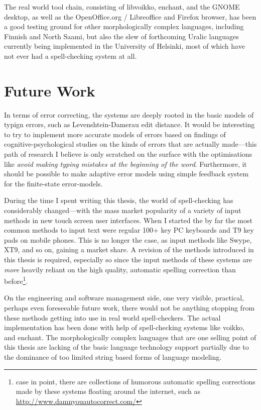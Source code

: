 \documentclass[officiallayout]{unihelcompling}
\begin{document}
The real world tool chain, consisting of libvoikko, enchant, and the GNOME
desktop, as well as the OpenOffice.org / Libreoffice and Firefox browser, has
been a good testing ground for other morphologically complex languages,
including Finnish and North Saami, but also the slew of forthcoming Uralic
languages currently being implemented in the University of Helsinki, most of
which have not ever had a spell-checking system at all. 

\section{Future Work}
\label{sec:future-work}

In terms of error correcting, the systems are deeply rooted in the basic models
of typign errors, such as Levenshtein-Damerau edit distance. It would be
interesting to try to implement more accurate models of errors based on
findings of cognitive-psychological studies on the kinds of errors that are
actually made---this path of research I believe is only scratched on the
surface with the optimisations like \emph{avoid making typing mistakes at the
beginning of the word}. Furthermore, it should be possible to make adaptive
error models using simple feedback system for the finite-state error-models.

During the time I spent writing this thesis, the world of spell-checking has
considerably changed---with the mass market popularity of a variety of input
methods in new touch screen user interfaces. When I started the by far the most
common methods to input text were regular 100+ key PC keyboards and T9 key pads
on mobile phones. This is no longer the case, as input methods like Swype, XT9,
and so on, gaining a market share. A revision of the methods introduced in this
thesis is required, especially so since the input methods of these systems are
\emph{more} heavily reliant on the high quality, automatic spelling correction
than before\footnote{case in point, there are collections of humorous automatic
    spelling corrections made by these systems floating around the internet,
such as \url{http://www.damnyouautocorrect.com/}}.

On the engineering and software management side, one very visible, practical,
perhaps even foreseeable future work, there would not be anything stopping from
these methods getting into use in real world spell-checkers. The actual
implementation has been done with help of spell-checking systems like voikko,
and enchant. The morphologically complex languages that are one selling point
of this thesis are lacking of the basic language technology support partially
due to the dominance of too limited string based forms of language modeling.
\end{document}
